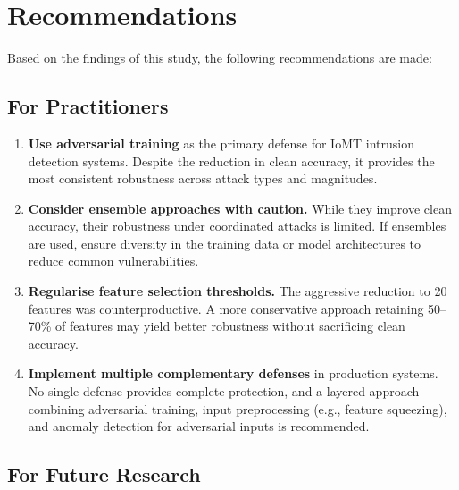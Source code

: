 \documentclass[12pt,a4paper,oneside]{report}
\begin{document}
\section{Recommendations}

Based on the findings of this study, the following recommendations are made:

\subsection{For Practitioners}

\begin{enumerate}
    \item \textbf{Use adversarial training} as the primary defense for IoMT intrusion detection systems. Despite the reduction in clean accuracy, it provides the most consistent robustness across attack types and magnitudes.
    \item \textbf{Consider ensemble approaches with caution.} While they improve clean accuracy, their robustness under coordinated attacks is limited. If ensembles are used, ensure diversity in the training data or model architectures to reduce common vulnerabilities.
    \item \textbf{Regularise feature selection thresholds.} The aggressive reduction to 20 features was counterproductive. A more conservative approach retaining 50--70\% of features may yield better robustness without sacrificing clean accuracy.
    \item \textbf{Implement multiple complementary defenses} in production systems. No single defense provides complete protection, and a layered approach combining adversarial training, input preprocessing (e.g., feature squeezing), and anomaly detection for adversarial inputs is recommended.
\end{enumerate}

\subsection{For Future Research}
\end{document}
